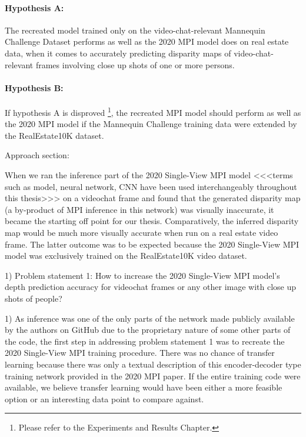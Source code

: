 \paragraph{Hypothesis A:}
The recreated model trained only on the video-chat-relevant Mannequin Challenge Dataset performs as well as the 2020 MPI model does on real estate data, when it comes to accurately predicting disparity maps of video-chat-relevant frames involving close up shots of one or more persons.

\paragraph{Hypothesis B:}
If hypothesis A is disproved \footnote{Please refer to the Experiments and Results Chapter.}, the recreated MPI model should perform as well as the 2020 MPI model if the Mannequin Challenge training data were extended by the RealEstate10K dataset.

Approach section:

When we ran the inference part of the 2020 Single-View MPI model <<<terms such as model, neural network, CNN have been used interchangeably throughout this thesis>>> on a videochat frame and found that the generated disparity map (a by-product of MPI inference in this network) was visually inaccurate, it became the starting off point for our thesis. Comparatively, the inferred disparity map would be much more visually accurate when run on a real estate video frame. The latter outcome was to be expected because the 2020 Single-View MPI model was exclusively trained on the RealEstate10K video dataset.   

1) Problem statement 1: How to increase the 2020 Single-View MPI model’s depth prediction accuracy for videochat frames or any other image with close up shots of people? 

1) As inference was one of the only parts of the network made publicly available by the authors on GitHub due to the proprietary nature of some other parts of the code, the first step in addressing problem statement 1 was to recreate the 2020 Single-View MPI training procedure. There was no chance of transfer learning because there was only a textual description of this encoder-decoder type training network provided in the 2020 MPI paper. If the entire training code were available, we believe transfer learning would have been either a more feasible option or an interesting data point to compare against. 

